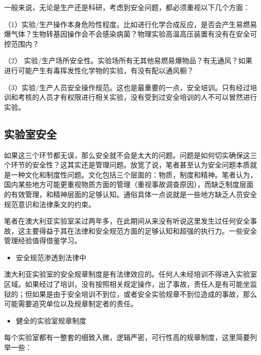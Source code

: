 \documentclass[]{book}
\providecommand{\tightlist}{%
  \setlength{\itemsep}{0pt}\setlength{\parskip}{0pt}}
\begin{document}
一般来说，无论是生产还是科研，考虑到安全问题，都必须重视以下几个方面：

（1）实验/生产操作本身危险性程度。比如进行化学合成反应，是否会产生易燃易爆气体？生物转基因操作会不会感染病菌？物理实验高温高压装置有没有在安全可控范围内？

（2） 实验/生产场所安全性。实验场所有无其他易燃易爆物品？有无通风？如果进行可能产生有毒挥发性化学物的实验，有没有配以通风橱？

（3）实验/生产人员安全操作规范。这也是最重要的一点，安全培训。只有经过培训和考核的人员才有权限进行相关实验，没有受到过安全培训的人不可以冒然进行实验。

\hypertarget{ux5b9eux9a8cux5ba4ux5b89ux5168}{%
\subsection{实验室安全}\label{ux5b9eux9a8cux5ba4ux5b89ux5168}}

如果这三个环节都无误，那么安全就不会是太大的问题。问题是如何切实确保这三个环节的安全性？这其实还是管理问题。放宽了说，笔者甚至认为安全问题本质就是一种文化和制度性问题。文化包括三个层面的：物质，制度和精神。笔者认为，国内某些地方可能更重视物质方面的管理（重视事故调查原因），而缺乏制度层面的有效管理，和精神层面的足够认知。通俗具体一点说就是一些地方缺乏人员安全规范意识和法律条文的约束。

笔者在澳大利亚实验室呆过两年多，在此期间从来没有听说这里发生过任何安全事故，这主要得益于其在法律和安全规范方面的足够认知和超强的执行力。一些安全管理经验值得借鉴学习。

\begin{itemize}
\tightlist
\item
  安全规范渗透到法律中
\end{itemize}

澳大利亚实验室的安全规章制度是有法律效应的。任何人未经培训不得进入实验室区域。如果经过了培训，没有按照相关规定操作，出了事故，责任人是有可能坐监狱的；但如果是由于安全培训不到位，或者安全实验规章不到位造成的事故，那么可能需要追究单位以及规章制定者的责任。

\begin{itemize}
\tightlist
\item
  健全的实验室规章制度
\end{itemize}

每个实验室都有一整套的细致入微，逻辑严密，可行性高的规章制度，这里简要列举一些：
\end{document}
